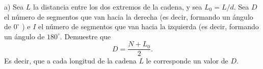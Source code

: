 a) Sea $L$ la distancia entre los dos extremos de la cadena, y sea $L_0=L / d$. Sea $D$ el número de segmentos que van hacia la derecha (es decir, formando un ángulo de $0^{\circ}$ ) e $I$ el número de segmentos que van hacia la izquierda (es decir, formando un ángulo de $180^{\circ}$. Demuestre que
$$
D=\frac{N+L_0}{2} .
$$
Es decir, que a cada longitud de la cadena $L$ le corresponde un valor de $D$.